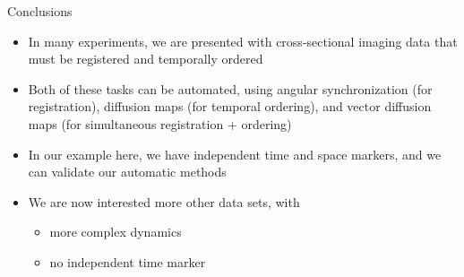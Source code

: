 \documentclass[10pt]{beamer}
\begin{document}
\begin{frame}{Conclusions}

\begin{itemize}
\item In many experiments, we are presented with cross-sectional imaging data that must be registered and temporally ordered
\item Both of these tasks can be automated, using angular synchronization (for registration), diffusion maps (for temporal ordering), and vector diffusion maps (for simultaneous registration + ordering)
\item In our example here, we have independent time and space markers, and we can validate our automatic methods
\item We are now interested more other data sets, with 
\begin{itemize}
\item  more complex dynamics
\item no independent time marker
\end{itemize}
\end{itemize}
\end{frame}
\end{document}
